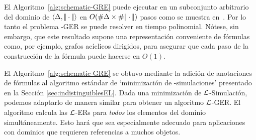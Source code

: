 


El Algoritmo~\ref{alg:schematic-GRE} puede ejecutar en un subconjunto arbitrario del dominio de $\langle \Delta,|\!|\cdot|\!| \rangle$
 en $O(\# \Delta\times\# |\!|\cdot|\!|)$ pasos como se muestra en~\cite{HHK95}. Por lo tanto el problema \EL-GER se puede resolver en tiempo polinomial. N\'otese, sin embargo, que este resultado supone una representaci\'on conveniente de
f\'ormulas como, por ejemplo, grafos ac\'iclicos dirigidos, para asegurar que
cada paso de la construcci\'on de la f\'ormula puede hacerse en $O(1)$. %


%


El Algoritmo~\ref{alg:schematic-GRE} se obtuvo mediante la adici\'on de anotaciones de f\'ormulas
al algoritmo est\'andar de `minimizaci\'on de \EL-simulaciones' presentado en la Secci\'on \ref{sec:indistinguiblesEL}. Dada una minimizaci\'on de
$\mathcal{L}$-Simulaci\'on, podemos adaptarlo de
manera similar para obtener un algoritmo $\mathcal{L}$-GER.
El algoritmo calcula las $\mathcal{L}$-ERs para \emph{todos} los elementos del
dominio simult\'aneamente.
Esto har\'a que sea especialmente adecuado para aplicaciones con
dominios que requieren referencias a muchos objetos.

